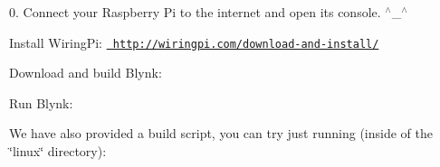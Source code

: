 0. Connect your Raspberry Pi to the internet and open it\textquotesingle{}s console. $^\wedge$\+\_\+$^\wedge$


\begin{DoxyEnumerate}
\item Install Wiring\+Pi\+: \href{http://wiringpi.com/download-and-install/}{\texttt{ http\+://wiringpi.\+com/download-\/and-\/install/}}
\item Download and build Blynk\+: 
\begin{DoxyCode}{0}

\end{DoxyCode}

\item Run Blynk\+: 
\begin{DoxyCode}{0}

\end{DoxyCode}

\end{DoxyEnumerate}

We have also provided a build script, you can try just running (inside of the \char`\"{}linux\char`\"{} directory)\+:


\begin{DoxyCode}{0}

\end{DoxyCode}
 
